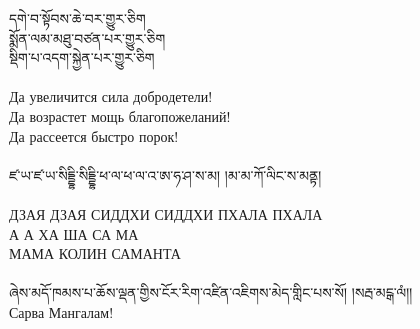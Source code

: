 \ti
དགེ་བ་སྟོབས་ཆེ་བར་གྱུར་ཅིག \\
སྨོན་ལམ་མཐུ་བཙན་པར་གྱུར་ཅིག \\
སྡིག་པ་འདག་སྐྱེན་པར་གྱུར་ཅིག \\
\\
\ru \noindent
Да увеличится сила добродетели!\\
Да возрастет мощь благопожеланий!\\
Да рассеется быстро порок!\\
\\
\ti ཛ་ཡ་ཛ་ཡ་སིདྡྷི་སིདྡྷི་ཕ་ལ་ཕ་ལ་འ་ཨ་ཧ་ཤ་ས་མ། །མ་མ་ཀོ་ལིང་ས་མནྟ། \\
\\
\ru ДЗАЯ ДЗАЯ СИДДХИ СИДДХИ ПХАЛА ПХАЛА\\
А А ХА ША СА МА\\
МАМА КОЛИН САМАНТА\\
\\
\scriptsize
\ti ཞེས་མདོ་ཁམས་པ་ཆོས་ལྡན་གྱིས་ངོར་རིག་འཛིན་འཇིགས་མེད་གླིང་པས་སོ། །སརྦ་མངྒ་ལཾ།།\\
\ru Сарва Мангалам!
\normalsize




